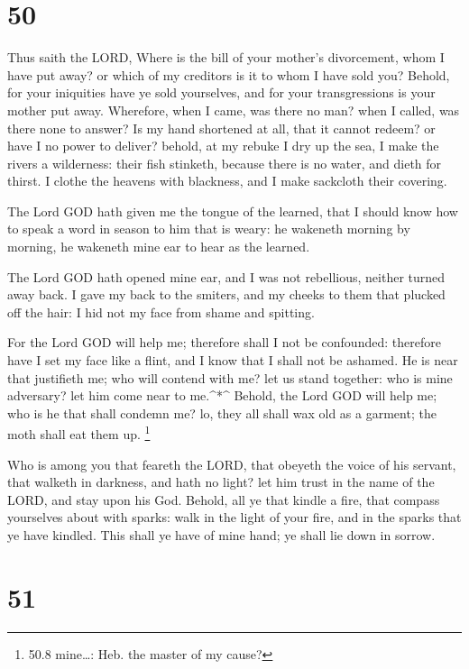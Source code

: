 \hypertarget{section-49}{%
\section{50}\label{section-49}}

 Thus saith the LORD, Where is the bill of your mother's
divorcement, whom I have put away? or which of my creditors is it to
whom I have sold you? Behold, for your iniquities have ye sold
yourselves, and for your transgressions is your mother put away.
 Wherefore, when I came, was there no man? when I called,
was there none to answer? Is my hand shortened at all, that it cannot
redeem? or have I no power to deliver? behold, at my rebuke I dry up the
sea, I make the rivers a wilderness: their fish stinketh, because there
is no water, and dieth for thirst.  I clothe the heavens
with blackness, and I make sackcloth their covering.

 The Lord GOD hath given me the tongue of the learned, that
I should know how to speak a word in season to him that is weary: he
wakeneth morning by morning, he wakeneth mine ear to hear as the
learned.

 The Lord GOD hath opened mine ear, and I was not
rebellious, neither turned away back.  I gave my back to the
smiters, and my cheeks to them that plucked off the hair: I hid not my
face from shame and spitting.

 For the Lord GOD will help me; therefore shall I not be
confounded: therefore have I set my face like a flint, and I know that I
shall not be ashamed.  He is near that justifieth me; who
will contend with me? let us stand together: who is mine adversary? let
him come near to me.\^{}*\^{}  Behold, the Lord GOD will
help me; who is he that shall condemn me? lo, they all shall wax old as
a garment; the moth shall eat them up. \footnote{50.8 mine\ldots: Heb.
  the master of my cause?}

 Who is among you that feareth the LORD, that obeyeth the
voice of his servant, that walketh in darkness, and hath no light? let
him trust in the name of the LORD, and stay upon his God. 
Behold, all ye that kindle a fire, that compass yourselves about with
sparks: walk in the light of your fire, and in the sparks that ye have
kindled. This shall ye have of mine hand; ye shall lie down in sorrow.

\hypertarget{section-50}{%
\section{51}\label{section-50}}

